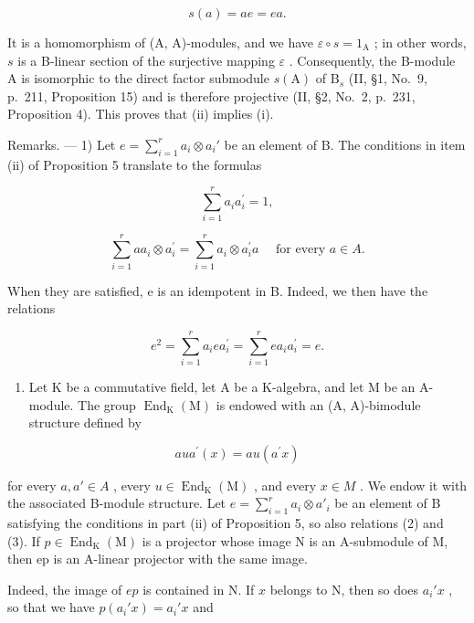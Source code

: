 \[
s (a) = a e = e a.\tag{1}
\]

It is a homomorphism of (A, A)-modules, and we have \(\varepsilon \circ s = 1_{\mathrm{A}}\) ; in other words, \(s\) is a B-linear section of the surjective mapping \(\varepsilon\) . Consequently, the B-module A is isomorphic to the direct factor submodule \(s(\mathrm{A})\) of \(\mathrm{B}_s\) (II, §1, No.~9, p.~211, Proposition 15) and is therefore projective (II, §2, No.~2, p.~231, Proposition 4). This proves that (ii) implies (i).

Remarks. --- 1) Let \(e = \sum_{i=1}^{r} a_i \otimes a_i'\) be an element of B. The conditions in item (ii) of Proposition 5 translate to the formulas

\[
\sum_ {i = 1} ^ {r} a _ {i} a _ {i} ^ {\prime} = 1,\tag{2}
\]

\[
\sum_ {i = 1} ^ {r} a a _ {i} \otimes a _ {i} ^ {\prime} = \sum_ {i = 1} ^ {r} a _ {i} \otimes a _ {i} ^ {\prime} a \quad \text { for   every } a \in A.\tag{3}
\]

When they are satisfied, e is an idempotent in B. Indeed, we then have the relations

\[
e ^ {2} = \sum_ {i = 1} ^ {r} a _ {i} e a _ {i} ^ {\prime} = \sum_ {i = 1} ^ {r} e a _ {i} a _ {i} ^ {\prime} = e.
\]

\begin{enumerate}
\def\labelenumi{\arabic{enumi})}
\setcounter{enumi}{1}
\tightlist
\item
  Let K be a commutative field, let A be a K-algebra, and let M be an A-module. The group \(\operatorname{End}_{\mathrm{K}}(\mathrm{M})\) is endowed with an (A, A)-bimodule structure defined by
\end{enumerate}

\[
a u a ^ {\prime} (x) = a u \left(a ^ {\prime} x\right)
\]

for every \(a, a' \in A\) , every \(u \in \operatorname{End}_{\mathrm{K}}(\mathrm{M})\) , and every \(x \in M\) . We endow it with the associated B-module structure. Let \(e = \sum_{i=1}^{r} a_i \otimes a'_i\) be an element of B satisfying the conditions in part (ii) of Proposition 5, so also relations (2) and (3). If \(p \in \operatorname{End}_{\mathrm{K}}(\mathrm{M})\) is a projector whose image N is an A-submodule of M, then ep is an A-linear projector with the same image.

Indeed, the image of \(ep\) is contained in N. If \(x\) belongs to N, then so does \(a_i' x\) , so that we have \(p(a_i' x) = a_i' x\) and

